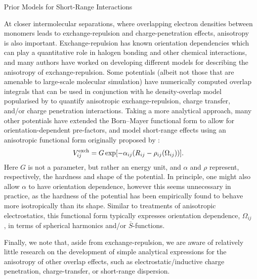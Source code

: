 \begin{subsection}{Prior Models for Short-Range Interactions}

At closer intermolecular separations, where overlapping electron densities between
monomers leads to exchange-repulsion and charge-penetration effects, anisotropy is also
important. Exchange-repulsion has known orientation
dependencies which can play a quantitative role in 
halogen bonding\cite{Bartocci2015,Stone2013} and other chemical interactions, and many
authors have worked on developing different models for describing the
anisotropy of exchange-repulsion.
Some potentials (albeit not those that are
amenable to large-scale molecular simulation) have numerically computed overlap
integrals that can be used in conjunction with 
he density-overlap model popularised by
\citeauthor{Wheatley1990}\cite{Wheatley1990,Kita1976a,Kim1981,Nyeland1986,Ihm1990}
to quantify anisotropic exchange-repulsion, charge transfer, and/or charge
penetration interactions.
\cite{Duke2014a,Cisneros2006,Elking2010,Chaudret2014a,Gavezzotti2003,Torheyden2006}
Taking a more analytical approach, many other potentials have extended the Born--Mayer functional
form\cite{Born1932} to allow for orientation-dependent pre-factors,
\cite{Stone2007,Mitchell2001,Price2000,Stone1988,Day2003,Torheyden2006,Totton2010,Misquitta2016,Price2010a} 
and model short-range effects using an anisotropic functional form originally
proposed by \citeauthor{Stone1988}:
%
\begin{align}
V^{\text{exch}}_{ij} = G\exp[-\alpha_{ij}(R_{ij} - \rho_{ij}(\Omega_{ij}))].
\end{align}
%
Here $G$ is not a parameter, but rather an energy unit,\cite{stone2013theory}
and $\alpha$ and $\rho$ represent, respectively, the hardness and shape of the
potential. In principle, one might also allow $\alpha$ to have orientation
dependence, however this seems unnecessary in practice, as the
hardness of the potential has been empirically found to behave more
isotropically than its shape.\cite{stone2013theory} Similar to treatments of
anisotropic electrostatics, this functional form typically expresses
orientation dependence, $\Omega_{ij}$, in terms of spherical harmonics
and/or $\bar{S}$-functions.\cite{stone2013theory}

Finally, we note that, aside from exchange-repulsion, 
we are aware of relatively little research on the development of simple
analytical expressions for the anisotropy of other overlap effects, such as electrostatic/inductive
charge penetration, charge-transfer, or short-range dispersion. 

\end{subsection}
